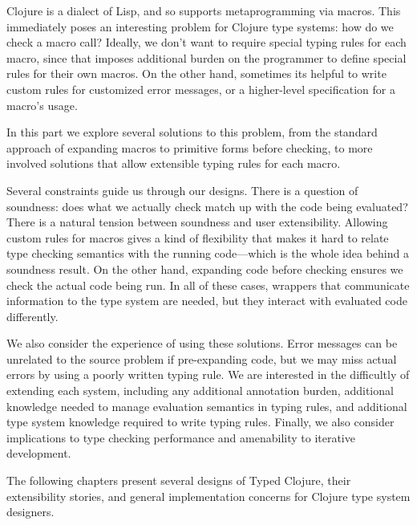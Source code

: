 
Clojure is a dialect of Lisp, and so supports metaprogramming
via macros.
This immediately poses an interesting problem for Clojure
type systems: how do we check a macro call?
Ideally, we don't want to require special typing rules for each
macro, since that imposes additional burden on the programmer
to define special rules for their own macros.
On the other hand, sometimes its helpful to write custom rules
for customized error messages, or a higher-level specification
for a macro's usage.

In this part we explore several solutions to this problem,
from the standard approach of expanding macros to
primitive forms before checking, to more involved solutions
that allow extensible typing rules for each macro.

Several constraints guide us through our designs.
There is a question of soundness: does what we actually
check match up with the code being evaluated?
There is a natural tension between soundness and user extensibility.
Allowing custom rules for macros gives a kind of flexibility
that makes it hard to relate type checking semantics with
the running code---which is the whole idea behind a soundness result.
On the other hand, expanding code before checking ensures
we check the actual code being run.
In all of these cases, wrappers that communicate information
to the type system are needed, but they interact
with evaluated code differently.

We also consider the experience of using these solutions.
Error messages can be unrelated to the source problem
if pre-expanding code, but we may miss actual errors
by using a poorly written typing rule.
We are interested in the difficultly of extending each system,
including any additional annotation burden,
additional knowledge needed to manage evaluation semantics
in typing rules, and additional type system knowledge required
to write typing rules. Finally, we also consider implications
to type checking performance and amenability to iterative development.

The following chapters present several designs of Typed Clojure,
their extensibility stories, and general implementation concerns for
Clojure type system designers.


